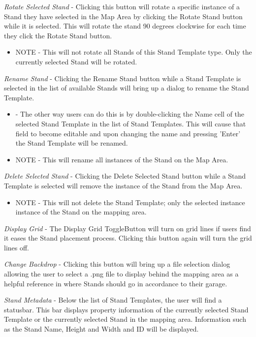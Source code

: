 \documentclass{report}
\begin{document}
\emph{Rotate Selected Stand} - Clicking this button will rotate a specific instance of
a Stand they have selected in the Map Area by clicking the Rotate Stand button while 
it is selected. This will rotate the stand 90 degrees clockwise for each time they click 
the Rotate Stand button.

\begin{itemize}
	\item NOTE - This will not rotate all Stands of this Stand Template type. Only the
currently selected Stand will be rotated.
\end{itemize}

\emph{Rename Stand} - Clicking the Rename Stand button while a Stand Template is 
selected in the list of available Stands will bring up a dialog to rename the Stand Template.
\begin{itemize}
	\item - The other way users can do this is by double-clicking the Name cell of 
the selected Stand Template in the list of Stand Templates. This will cause that field to
become editable and upon changing the name and pressing 'Enter' the Stand Template will
be renamed.
\end{itemize} 
\begin{itemize}
	\item NOTE - This will rename all instances of the Stand on the Map Area.
\end{itemize}

\emph{Delete Selected Stand} - Clicking the Delete Selected Stand button while a 
Stand Template is selected will remove the instance of the Stand from the Map Area.

\begin{itemize}
\item NOTE - This will not delete the Stand Template; only the selected instance
instance of the Stand on the mapping area.
\end{itemize}

\emph{Display Grid} - The Display Grid ToggleButton will turn on grid lines if users 
find it eases the Stand placement process. Clicking this button again will turn the grid
lines off.

\emph{Change Backdrop} - Clicking this button will bring up a file selection dialog 
allowing the user to select a .png file to display behind the mapping area as a 
helpful reference in where Stands should go in accordance to their garage.

\emph{Stand Metadata} - Below the list of Stand Templates, the user will find a
statusbar. This bar displays property information of the currently selected Stand
Template or the currently selected Stand in the mapping area. Information such as
the Stand Name, Height and Width and ID will be displayed.
\end{document}
